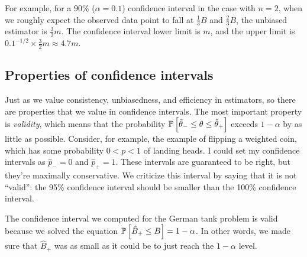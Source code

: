 For example, for a 90\% ($\alpha = 0.1$) confidence interval in the case with
$n=2$, when we roughly expect the observed data point to fall at $\tfrac{1}{3}
B$ and $\tfrac{2}{3} B$, the unbiased estimator is $\tfrac{3}{2} m$. The
confidence interval lower limit is $m$, and the upper limit is $0.1 ^{-1/2}
\times \tfrac{3}{2} m \approx 4.7 m$.

\subsection{Properties of confidence intervals}

Just as we value consistency, unbiasedness, and efficiency in estimators, so
there are properties that we value in confidence intervals. The most important property is
\emph{validity}, which means that the probability
$\mathbb{P}\left[{\hat{\theta}_- \leq \theta \leq \hat{\theta}_+}\right]$ exceeds $1-\alpha$ by
as little as possible. Consider, for example, the example of flipping a
weighted coin, which has some probability $0 < p < 1$ of landing heads. I
could set my confidence intervals as $\hat{p}_- = 0$ and $\hat{p}_+ = 1$.
These intervals are guaranteed to be right, but they're maximally
conservative. We criticize this interval by saying that it is not ``valid'':
the 95\% confidence interval should be smaller than the 100\% confidence
interval.

The confidence interval we computed for the German tank problem is valid
because we solved the equation $\mathbb{P}\left[{\hat{B}_+ \leq B}\right] = 1 - \alpha$. In
other words, we made sure that $\hat{B}_+$ was as small as it could be to just
reach the $1 - \alpha$ level.
